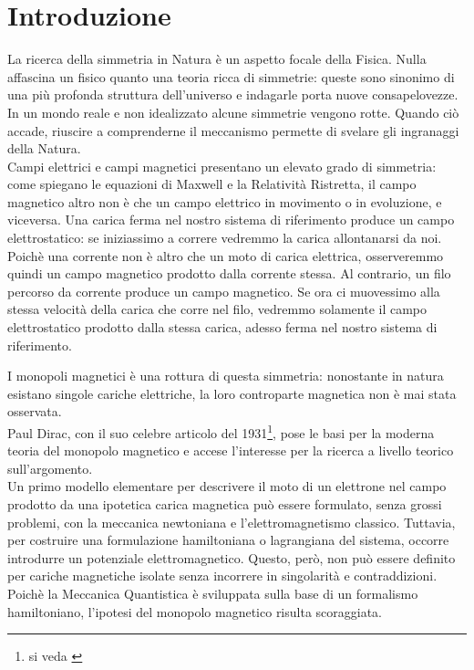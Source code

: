\chapter*{Introduzione}

La ricerca della simmetria in Natura è un aspetto focale della Fisica. Nulla
affascina un fisico quanto una teoria ricca di simmetrie: queste sono sinonimo
di una più profonda struttura dell'universo e indagarle porta nuove consapelovezze.
In un mondo reale e non idealizzato alcune simmetrie vengono rotte. Quando ciò
accade, riuscire a comprenderne il meccanismo permette di svelare gli ingranaggi
della Natura.\\

Campi elettrici e campi magnetici presentano un elevato grado di simmetria: come
spiegano le equazioni di Maxwell e la Relatività Ristretta, il campo magnetico
altro non è che un campo elettrico in movimento o in evoluzione, e viceversa.
Una carica ferma nel nostro sistema di riferimento produce un campo elettrostatico:
se iniziassimo a correre vedremmo la carica allontanarsi da noi. Poichè
una corrente non è altro che un moto di carica elettrica, osserveremmo quindi un campo
magnetico prodotto dalla corrente stessa.
Al contrario, un filo percorso da corrente produce un campo magnetico. Se ora ci muovessimo
alla stessa velocità della carica che corre nel filo, vedremmo solamente il campo
elettrostatico prodotto dalla stessa carica, adesso ferma nel nostro sistema di riferimento.

I monopoli magnetici è una rottura di questa simmetria: nonostante in natura
esistano singole cariche elettriche, la loro controparte magnetica non è mai
stata osservata.\\

Paul Dirac, con il suo celebre articolo del 1931\footnote{si veda \cite{dirac}}, pose le basi per
la moderna teoria del monopolo magnetico e accese l'interesse per la ricerca a
livello teorico sull'argomento.\\
Un primo modello elementare per descrivere il moto di un elettrone
nel campo prodotto da una ipotetica carica magnetica può essere formulato,
senza grossi problemi, con la meccanica newtoniana e l'elettromagnetismo classico.
Tuttavia, per costruire una formulazione hamiltoniana o lagrangiana del sistema,
occorre introdurre un potenziale elettromagnetico. Questo, però, non può essere
definito per cariche magnetiche isolate senza incorrere in singolarità e contraddizioni.
Poichè la Meccanica Quantistica è sviluppata sulla base di un formalismo
hamiltoniano, l'ipotesi del monopolo magnetico risulta scoraggiata.

